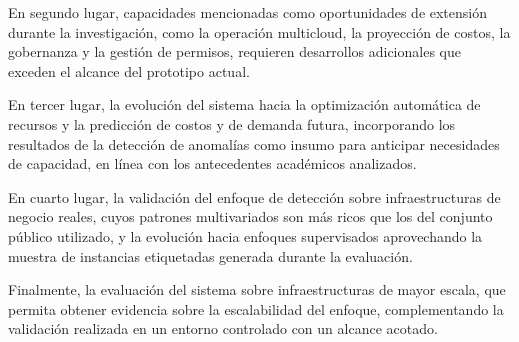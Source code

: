 En segundo lugar, capacidades mencionadas como oportunidades de extensión durante la investigación, como la operación multicloud, la proyección de costos, la gobernanza y la gestión de permisos, requieren desarrollos adicionales que exceden el alcance del prototipo actual.

En tercer lugar, la evolución del sistema hacia la optimización automática de recursos y la predicción de costos y de demanda futura, incorporando los resultados de la detección de anomalías como insumo para anticipar necesidades de capacidad, en línea con los antecedentes académicos analizados.

En cuarto lugar, la validación del enfoque de detección sobre infraestructuras de negocio reales, cuyos patrones multivariados son más ricos que los del conjunto público utilizado, y la evolución hacia enfoques supervisados aprovechando la muestra de instancias etiquetadas generada durante la evaluación.

Finalmente, la evaluación del sistema sobre infraestructuras de mayor escala, que permita obtener evidencia sobre la escalabilidad del enfoque, complementando la validación realizada en un entorno controlado con un alcance acotado.
